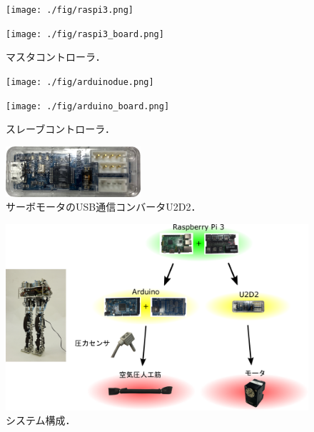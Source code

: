  \begin{figure}
  \begin{minipage}[b]{.45\hsize}
   \centering
   \texttt{[image: ./fig/raspi3.png]} 
  \end{minipage}
  \begin{minipage}[b]{.45\hsize}
   \centering
   \texttt{[image: ./fig/raspi3\_board.png]}
  \end{minipage}
  \caption{マスタコントローラ．\label{master}}
  \begin{minipage}[b]{.45\hsize}
   \centering
   \texttt{[image: ./fig/arduinodue.png]}
  \end{minipage}
  \begin{minipage}[b]{.45\hsize}
   \centering
   \texttt{[image: ./fig/arduino\_board.png]}
  \end{minipage}
  \caption{スレーブコントローラ．\label{slave}}
 \end{figure}

\begin{figure}[htbp]
 \centering
 \includegraphics[clip,width = 5cm]{./fig/u2d2.png}
    \caption{サーボモータのUSB通信コンバータU2D2．\label{u2d2}}
\end{figure}

\begin{figure}[htbp]
 \centering
 \includegraphics[clip,width = 16cm]{./fig/system.png}
    \caption{システム構成．\label{circuit}}
\end{figure}



